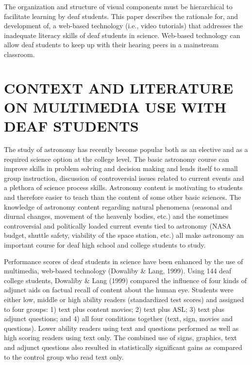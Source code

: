 \documentclass[11.5pt]{sig-alternate} %
\begin{document}
\begin{large}
The organization and structure of visual components must be hierarchical to facilitate learning by deaf students.  This paper describes the rationale for, and development of, a web-based technology (i.e., video tutorials) that addresses the inadequate literacy skills of deaf students in science.  Web-based technology can allow deaf students to keep up with their hearing peers in a mainstream classroom. 
 
\section*{CONTEXT AND LITERATURE ON MULTIMEDIA USE WITH DEAF STUDENTS}
 
The study of astronomy has recently become popular both as an elective and as a required science option at the college level.  The basic astronomy course can improve skills in problem solving and decision making and lends itself to small group instruction, discussion of controversial issues related to current events and a plethora of science process skills.  Astronomy content is motivating to students and therefore easier to teach than the content of some other basic sciences.  The knowledge of astronomy content regarding natural phenomena (seasonal and diurnal changes, movement of the heavenly bodies, etc.) and the sometimes controversial and politically loaded current events tied to astronomy (NASA budget, shuttle safety, viability of the space station, etc.) all make astronomy an important course for deaf high school and college students to study. 
 
Performance scores of deaf students in science have been enhanced by the use of multimedia, web-based technology (Dowaliby \& Lang, 1999).  Using 144 deaf college students, Dowaliby \& Lang (1999) compared the influence of four kinds of adjunct aids on factual recall of content about the human eye.  Students were either low, middle or high ability readers (standardized test scores) and assigned to four groups:  1) text plus content movies; 2) text plus ASL; 3) text plus adjunct questions; and 4) all four conditions together (text, sign, movies and questions).  Lower ability readers using text and questions performed as well as high scoring readers using text only.  The combined use of signs, graphics, text and adjunct questions also resulted in statistically significant gains as compared to the control group who read text only. 
 

\end{large}
\end{document}
